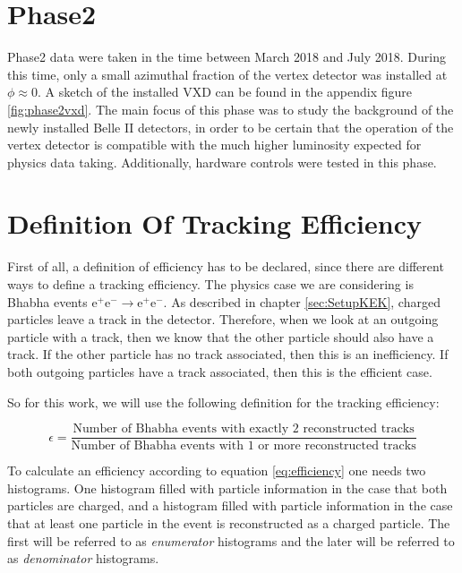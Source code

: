 \documentclass[a4paper,11pt,twosided,final,german,openbib,pdftex,listof=totoc,bibliography=totoc]{scrbook}
\begin{document}
\section{Phase2}
\label{sec:Phase2}

Phase2 data were taken in the time between March 2018 and July 2018. During this time, only a small azimuthal fraction of the vertex detector was installed at $\phi \approx 0$. A sketch of the installed VXD can be found in the appendix figure \ref{fig:phase2vxd}. The main focus of this phase was to study the background of the newly installed Belle II detectors, in order to be certain that the operation of the vertex detector is compatible with the much higher luminosity expected for physics data taking. Additionally, hardware controls were tested in this phase.


\section{Definition Of Tracking Efficiency}
\label{sec:Eff}

First of all, a definition of efficiency has to be declared, since there are different ways to define a tracking efficiency. The physics case we are considering is Bhabha events $ \textrm{e}^+ \textrm{e}^- \rightarrow \textrm{e}^+ \textrm{e}^- $. As described in chapter \ref{sec:SetupKEK}, charged particles leave a track in the detector. Therefore, when we look at an outgoing particle with a track, then we know that the other particle should also have a track. If the other particle has no track associated, then this is an inefficiency. If both outgoing particles have a track associated, then this is the efficient case.

So for this work, we will use the following definition for the tracking efficiency:

\begin{equation}
	\epsilon = \frac{\textrm{Number of Bhabha events with exactly 2 reconstructed tracks}}{\textrm{Number of Bhabha events with 1 or more reconstructed tracks}}
	\label{eq:efficiency}
\end{equation}


To calculate an efficiency according to equation \ref{eq:efficiency} one needs two histograms. One histogram filled with particle information in the case that both particles are charged, and a histogram filled with particle information in the case that at least one particle in the event is reconstructed as a charged particle. The first will be referred to as \textit{enumerator} histograms and the later will be referred to as \textit{denominator} histograms.
\end{document}
